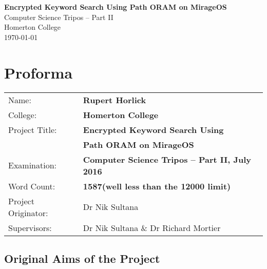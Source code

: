 \documentclass[12pt,a4paper,twoside,openright]{report}
\begin{document}





\pagestyle{empty}


\vspace*{60mm}
\begin{center}
\Huge
\textbf{Encrypted Keyword Search Using Path ORAM on MirageOS} \\[5mm]
Computer Science Tripos -- Part II \\[5mm]
Homerton College \\[5mm]
\today  %
\end{center}


\pagestyle{plain}

\chapter*{Proforma}

{\large
\begin{tabular}{ll}
Name:               & \bf Rupert Horlick                       \\
College:            & \bf Homerton College                     \\
Project Title:      & \bf Encrypted Keyword Search Using \\
& \bf Path ORAM on MirageOS \\
Examination:        & \bf Computer Science Tripos -- Part II, July 2016  \\
Word Count:         & \bf 1587\footnotemark[1]
                      (well less than the 12000 limit)  \\
Project Originator: & Dr Nik Sultana                    \\
Supervisors:         & Dr Nik Sultana \& Dr Richard Mortier                    \\ 
\end{tabular}
}


\section*{Original Aims of the Project}
\end{document}
